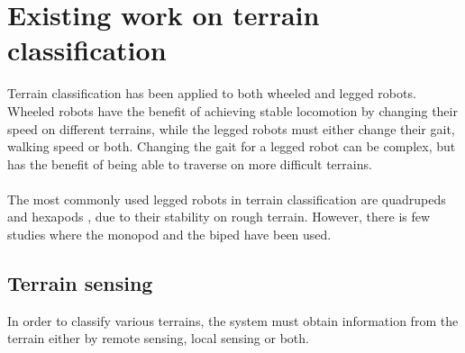 \documentclass[USenglish]{ifimaster}  %
\begin{document}
	
\section{Existing work on terrain classification}
Terrain classification has been applied to both wheeled and legged robots. Wheeled robots have the benefit of achieving stable locomotion by changing their speed on different terrains, while the legged robots must either change their gait, walking speed or both. Changing the gait for a legged robot can be complex, but has the benefit of being able to traverse on more difficult terrains. 
\\
\\
The most commonly used legged robots in terrain classification are quadrupeds  \cite{6784609,littleDog,6849778,Hoffmann20141790} and hexapods \cite{Walas2015,26b23e912c654fe4b7478fd910130195,6569179}, due to their stability on rough terrain. However, there is few studies where the monopod \cite{5602459} and the biped \cite{7803265} have been used.

		
		
\subsection{Terrain sensing}
In order to classify various terrains, the system must obtain information from the terrain either by remote sensing, local sensing or both.
	
\end{document}
